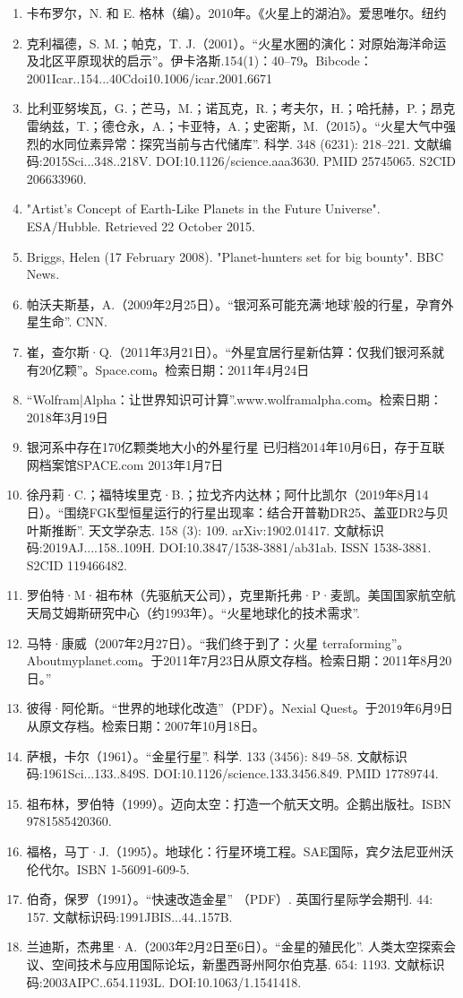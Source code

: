 \begin{enumerate}
\item 卡布罗尔，N. 和 E. 格林（编）。2010年。《火星上的湖泊》。爱思唯尔。纽约
\item 克利福德，S. M.；帕克，T. J.（2001）。“火星水圈的演化：对原始海洋命运及北区平原现状的启示”。伊卡洛斯.154(1)：40–79。Bibcode：2001Icar..154...40Cdoi10.1006/icar.2001.6671
\item 比利亚努埃瓦，G.；芒马，M.；诺瓦克，R.；考夫尔，H.；哈托赫，P.；昂克雷纳兹，T.；德仓永，A.；卡亚特，A.；史密斯，M.（2015）。“火星大气中强烈的水同位素异常：探究当前与古代储库”. 科学. 348 (6231): 218–221. 文献编码:2015Sci...348..218V. DOI:10.1126/science.aaa3630. PMID 25745065. S2CID 206633960.
\item "Artist's Concept of Earth-Like Planets in the Future Universe". ESA/Hubble. Retrieved 22 October 2015.
\item Briggs, Helen (17 February 2008). "Planet-hunters set for big bounty". BBC News.
\item 帕沃夫斯基，A.（2009年2月25日）。“银河系可能充满‘地球’般的行星，孕育外星生命”. CNN.
\item 崔，查尔斯·Q.（2011年3月21日）。“外星宜居行星新估算：仅我们银河系就有20亿颗”。Space.com。检索日期：2011年4月24日
\item “Wolfram|Alpha：让世界知识可计算”.www.wolframalpha.com。检索日期：2018年3月19日
\item 银河系中存在170亿颗类地大小的外星行星 已归档2014年10月6日，存于互联网档案馆SPACE.com 2013年1月7日
\item 徐丹莉·C.；福特埃里克·B.；拉戈齐内达林；阿什比凯尔（2019年8月14日）。“围绕FGK型恒星运行的行星出现率：结合开普勒DR25、盖亚DR2与贝叶斯推断”. 天文学杂志. 158 (3): 109. arXiv:1902.01417. 文献标识码:2019AJ....158..109H. DOI:10.3847/1538-3881/ab31ab. ISSN 1538-3881. S2CID 119466482.
\item 罗伯特·M·祖布林（先驱航天公司），克里斯托弗·P·麦凯。美国国家航空航天局艾姆斯研究中心（约1993年）。“火星地球化的技术需求”.
\item 马特·康威（2007年2月27日）。“我们终于到了：火星 terraforming”。Aboutmyplanet.com。于2011年7月23日从原文存档。检索日期：2011年8月20日。”
\item 彼得·阿伦斯。“世界的地球化改造”（PDF）。Nexial Quest。于2019年6月9日从原文存档。检索日期：2007年10月18日。
\item 萨根，卡尔（1961）。“金星行星”. 科学. 133 (3456): 849–58. 文献标识码:1961Sci...133..849S. DOI:10.1126/science.133.3456.849. PMID 17789744.
\item 祖布林，罗伯特（1999）。迈向太空：打造一个航天文明。企鹅出版社。ISBN 9781585420360.
\item 福格，马丁·J.（1995）。地球化：行星环境工程。SAE国际，宾夕法尼亚州沃伦代尔。ISBN 1-56091-609-5.
\item 伯奇，保罗（1991）。“快速改造金星” （PDF）. 英国行星际学会期刊. 44: 157. 文献标识码:1991JBIS...44..157B.
\item 兰迪斯，杰弗里·A.（2003年2月2日至6日）。“金星的殖民化”. 人类太空探索会议、空间技术与应用国际论坛，新墨西哥州阿尔伯克基. 654: 1193. 文献标识码:2003AIPC..654.1193L. DOI:10.1063/1.1541418.
\end{enumerate}

